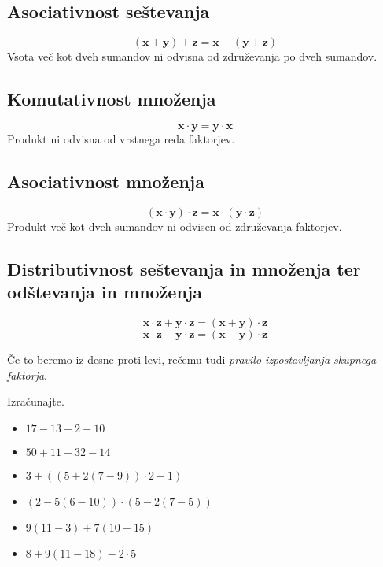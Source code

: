             
                    \subsection*{Asociativnost seštevanja}
                    $$ \mathbf{(x+y)+z=x+(y+z)}$$
                    Vsota več kot dveh sumandov ni odvisna od združevanja po dveh sumandov.
                 
            
                    \subsection*{Komutativnost množenja}
                    $$ \mathbf{x\cdot y=y\cdot x}$$
                    Produkt ni odvisna od vrstnega reda faktorjev.
                 
            
                    \subsection*{Asociativnost množenja}
                    $$ \mathbf{(x\cdot y)\cdot z=x\cdot (y\cdot z)}$$
                    Produkt več kot dveh sumandov ni odvisen od združevanja faktorjev.
                 
                    \subsection*{Distributivnost seštevanja in množenja ter odštevanja in množenja}
                    $$ \mathbf{x\cdot z+y\cdot z = (x+y)\cdot z} $$
                    $$ \mathbf{x\cdot z-y\cdot z = (x-y)\cdot z} $$

                    Če to beremo iz desne proti levi, rečemu tudi \textit{pravilo izpostavljanja skupnega faktorja}.
            
        
                
                    \begin{naloga}
                        Izračunajte.
                        \begin{itemize}
                            \item $17-13-2+10$  
                            \item $50+11-32-14$  
                            \item $3+((5+2(7-9))\cdot 2-1)$  
                            \item $(2-5(6-10))\cdot(5-2(7-5))$  
                            \item $9(11-3)+7(10-15)$  
                            \item $8+9(11-18)-2\cdot 5$  
                        \end{itemize}
                    \end{naloga}
                
